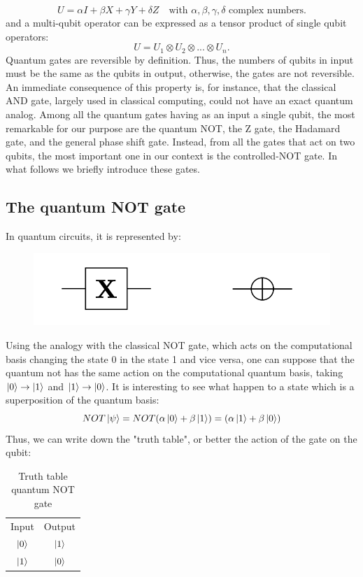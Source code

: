 \begin{equation*}
    U = \alpha I+\beta X+\gamma Y+\delta Z \quad \text{with $\alpha,\beta,\gamma,\delta$ complex numbers}.
\end{equation*}
and a multi-qubit operator can be expressed as a tensor product of single qubit operators:
\begin{equation*}
    U = U_1 \otimes U_2 \otimes ... \otimes U_n.
\end{equation*}
Quantum gates are reversible by definition. Thus, the numbers of qubits in input must be the same as the qubits in output, otherwise, the gates are not reversible. An immediate consequence of this property is, for instance, that the classical AND gate, largely used in classical computing, could not have an exact quantum analog.
Among all the quantum gates having as an input a single qubit, the most remarkable for our purpose are the quantum NOT, the Z gate, the Hadamard gate, and the general phase shift gate.
Instead, from all the gates that act on two qubits, the most important one in our context is the controlled-NOT gate.
In what follows we briefly introduce these gates. 

\subsection*{The quantum NOT gate}
In quantum circuits, it is represented by: \begin{figure}[H]
\centering
\includegraphics{Mainmatter/images/XGATE.png}
\end{figure}
Using the analogy with the classical NOT gate, which acts on the computational basis changing the state 0 in the state 1 and vice versa, one can suppose that the quantum not has the same action on the computational quantum basis, taking $\ket{0} \to \ket{1}$ and $\ket{1} \to \ket{0}$. It is interesting to see what happen to a state which is a superposition of the quantum basis: 
\begin{equation*}
    NOT \ket{\psi} = NOT(\alpha\ket{0} +\beta\ket{1}) = (\alpha\ket{1} +\beta\ket{0})
\end{equation*}
Thus, we can write down the "truth table", or better the action of the gate on the qubit: 
\begin{table}[h!]
    \centering
    \begin{tabular}{c|c}
         Input & Output \\
          $\ket{0}$ & $\ket{1}$ \\
          $\ket{1}$ & $\ket{0}$
    \end{tabular}
    \caption{Truth table quantum NOT gate}
    \label{tab:not_gate}
\end{table}


